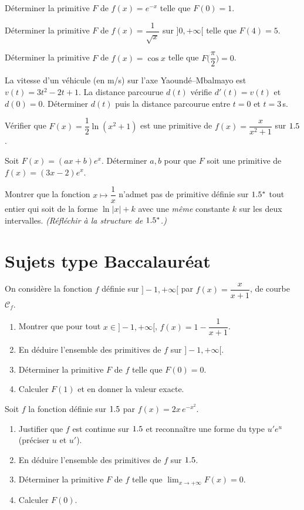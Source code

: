 \exo{} Déterminer la primitive $F$ de $f(x)=e^{-x}$ telle que $F(0)=1$.

\exo{} Déterminer la primitive $F$ de $f(x)=\dfrac{1}{\sqrt x}$ sur $]0,+\infty[$
telle que $F(4)=5$.

\exo{} Déterminer la primitive $F$ de $f(x)=\cos x$ telle que $F\!\Big(\dfrac\pi2\Big)=0$.

\exo{} La vitesse d'un véhicule (en m/s) sur l'axe Yaoundé–Mbalmayo est
$v(t)=3t^{2}-2t+1$. La distance parcourue $d(t)$ vérifie $d'(t)=v(t)$ et $d(0)=0$.
Déterminer $d(t)$ puis la distance parcourue entre $t=0$ et $t=3$\,s.

\exo{} Vérifier que $F(x)=\dfrac12\ln(x^{2}+1)$ est une primitive de
$f(x)=\dfrac{x}{x^{2}+1}$ sur $1.5$.

\exo{} Soit $F(x)=(ax+b)e^{x}$. Déterminer $a,b$ pour que $F$ soit une primitive de
$f(x)=(3x-2)e^{x}$.

\exo{} Montrer que la fonction $x\mapsto\dfrac1x$ n'admet pas de primitive définie sur
$1.5^{*}$ tout entier qui soit de la forme $\ln|x|+k$ avec une \emph{même} constante $k$ sur
les deux intervalles. \emph{(Réfléchir à la structure de $1.5^{*}$.)}

\section{Sujets type Baccalauréat}

On considère la fonction $f$ définie sur $]-1,+\infty[$ par
$f(x)=\dfrac{x}{x+1}$, de courbe $\mathcal C_f$.
\begin{enumerate}[label=\arabic*)]
\item Montrer que pour tout $x\in]-1,+\infty[$, $f(x)=1-\dfrac{1}{x+1}$.
\item En déduire l'ensemble des primitives de $f$ sur $]-1,+\infty[$.
\item Déterminer la primitive $F$ de $f$ telle que $F(0)=0$.
\item Calculer $F(1)$ et en donner la valeur exacte.
\end{enumerate}

Soit $f$ la fonction définie sur $1.5$ par $f(x)=2x\,e^{-x^{2}}$.
\begin{enumerate}[label=\arabic*)]
\item Justifier que $f$ est continue sur $1.5$ et reconnaître une forme du type $u'e^{u}$
(préciser $u$ et $u'$).
\item En déduire l'ensemble des primitives de $f$ sur $1.5$.
\item Déterminer la primitive $F$ de $f$ telle que $\displaystyle\lim_{x\to+\infty}F(x)=0$.
\item Calculer $F(0)$.
\end{enumerate}

